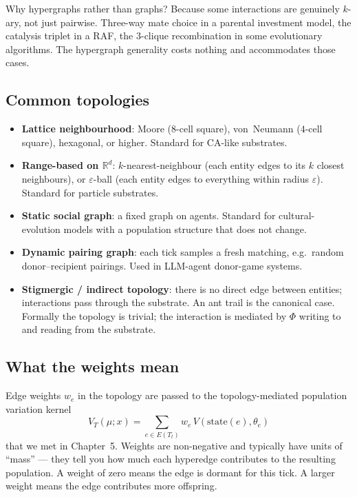 Why hypergraphs rather than graphs? Because some interactions are
genuinely $k$-ary, not just pairwise. Three-way mate choice in a
parental investment model, the catalysis triplet in a RAF, the
3-clique recombination in some evolutionary algorithms. The
hypergraph generality costs nothing and accommodates those cases.

\subsection*{Common topologies}

\begin{itemize}[leftmargin=1.5em,itemsep=2pt]
  \item \textbf{Lattice neighbourhood}: Moore ($8$-cell square),
    von~Neumann ($4$-cell square), hexagonal, or higher. Standard for
    CA-like substrates.
  \item \textbf{Range-based on $\mathbb{R}^d$}: $k$-nearest-neighbour
    (each entity edges to its $k$ closest neighbours), or
    $\varepsilon$-ball (each entity edges to everything within radius
    $\varepsilon$). Standard for particle substrates.
  \item \textbf{Static social graph}: a fixed graph on agents.
    Standard for cultural-evolution models with a population
    structure that does not change.
  \item \textbf{Dynamic pairing graph}: each tick samples a fresh
    matching, e.g.\ random donor--recipient pairings. Used in
    LLM-agent donor-game systems.
  \item \textbf{Stigmergic / indirect topology}: there is no direct
    edge between entities; interactions pass through the substrate.
    An ant trail is the canonical case. Formally the topology is
    trivial; the interaction is mediated by $\Phi$ writing to and
    reading from the substrate.
\end{itemize}

\subsection*{What the weights mean}

Edge weights $w_e$ in the topology are passed to the topology-mediated
population variation kernel
\[
  V_T(\mu; x) = \sum_{e \in E(T_t)} w_e\, V(\mathrm{state}(e),
  \theta_e)
\]
that we met in Chapter~5. Weights are non-negative and typically have
units of ``mass'' --- they tell you how much each hyperedge
contributes to the resulting population. A weight of zero means the
edge is dormant for this tick. A larger weight means the edge
contributes more offspring.

